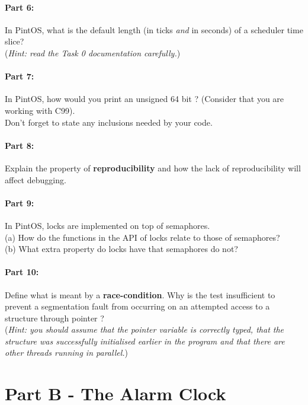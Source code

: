 \documentclass[a4paper,11pt]{article}
\begin{document}
\paragraph{Part 6:}
In PintOS, what is the default length (in ticks \emph{and} in seconds) of a scheduler time slice? \\
(\textit{Hint: read the Task 0 documentation carefully.})

\paragraph{Part 7:}
In PintOS, how would you print an unsigned 64 bit ?
(Consider that you are working with C99). \\
Don't forget to state any inclusions needed by your code.

\paragraph{Part 8:}
Explain the property of {\bf reproducibility} and how the lack of reproducibility will affect debugging.

\paragraph{Part 9:}
In PintOS, locks are implemented on top of semaphores.\\
(a) How do the functions in the API of locks relate to those of semaphores?\\
(b) What extra property do locks have that semaphores do not?

\paragraph{Part 10:}
Define what is meant by a {\bf race-condition}. Why is the test  
insufficient to prevent a segmentation fault from occurring on an attempted access to a structure through pointer ?\\
(\textit{Hint: you should assume that the pointer variable is correctly typed, that the structure was successfully initialised earlier in the program 
and that there are other threads running in parallel.})

\pagebreak
\section*{Part B - The Alarm Clock}
\end{document}
